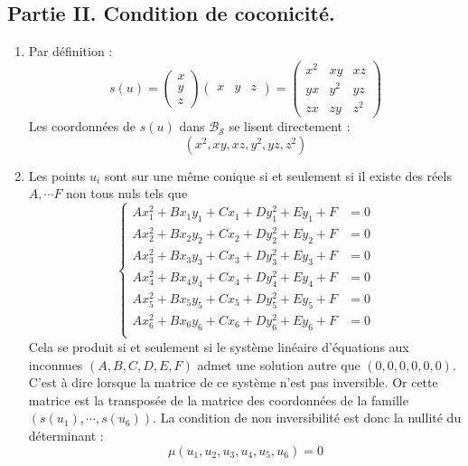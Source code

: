 \subsection*{Partie II. Condition de \og coconicité\fg. }
\begin{enumerate}
 \item Par définition :
\begin{displaymath}
 s(u)=
\begin{pmatrix}
 x \\ y \\ z
\end{pmatrix}
\begin{pmatrix}
 x & y & z
\end{pmatrix}
=
\begin{pmatrix}
 x^2 & xy & xz \\
 yx & y^2 & yz \\
 zx & zy & z^2 
\end{pmatrix}
\end{displaymath}
Les coordonnées de $s(u)$ dans $\mathcal B_{\mathcal S}$ se lisent directement :
\begin{displaymath}
 (x^2, xy, xz, y^2, yz, z^2)
\end{displaymath}

\item Les points $u_i$ sont sur une même conique si et seulement si il existe des réels $A, \cdots F$ non tous nuls tels que
\begin{displaymath}
 \left\lbrace
\begin{aligned}
 Ax_1^2 + B x_1y_1 + C x_1 + D y_1^2 + Ey_1 + F &= 0 \\
 Ax_2^2 + B x_2y_2 + C x_2 + D y_2^2 + Ey_2 + F &= 0 \\
 Ax_3^2 + B x_3y_3 + C x_3 + D y_3^2 + Ey_3 + F &= 0 \\
 Ax_4^2 + B x_4y_4 + C x_4 + D y_4^2 + Ey_4 + F &= 0 \\
 Ax_5^2 + B x_5y_5 + C x_5 + D y_5^2 + Ey_5 + F &= 0 \\
 Ax_6^2 + B x_6y_6 + C x_6 + D y_6^2 + Ey_6 + F &= 0 \\
\end{aligned}
 \right. 
\end{displaymath}
Cela se produit si et seulement si le système linéaire d'équations aux inconnues $(A,B,C,D,E,F)$ admet une solution autre que $(0,0,0,0,0,0)$. C'est à dire lorsque la matrice de ce système n'est pas inversible. Or cette matrice est la transposée de la matrice des coordonnées de la famille $(s(u_1),\cdots,s(u_6))$. La condition de non inversibilité est donc la nullité du déterminant :
\begin{displaymath}
 \mu(u_1,u_2,u_3,u_4,u_5,u_6)=0
\end{displaymath}

\end{enumerate}

